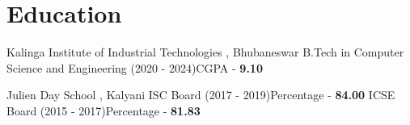 \section{Education}
    \resumeSubHeadingListStart
    \resumeSubheading
    {\color{Hblue} Kalinga Institute of Industrial Technologies , Bhubaneswar}{}
    {B.Tech in Computer Science and Engineering (2020 - 2024)}{CGPA - \bfseries9.10}
    
    \vspace{1.5mm}
    \resumeSubheading
    {\color{Hblue} Julien Day School , Kalyani}{}
    {ISC Board (2017 - 2019)}{Percentage - \bfseries84.00}
    \vspace{-2pt}
    \resumeSubSubheading
    {ICSE Board (2015 - 2017)}{Percentage - \bfseries81.83}
    
    

    \resumeSubHeadingListEnd